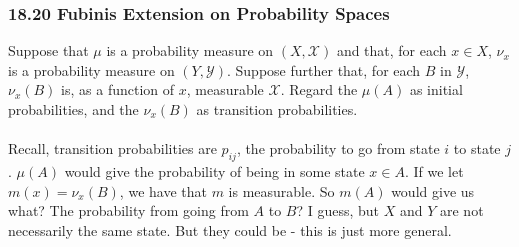 \documentclass[12pt,a4paper]{article}
\newcommand{\1}[1]{\mathbbm{1}\left\{ #1 \right\}}
\newcommand{\xcal}{\mathcal{X}}
\newcommand{\ycal}{\mathcal{Y}}
\begin{document}
\subsubsection{18.20 Fubinis Extension on Probability Spaces} Suppose that $\mu$ is a probability measure on $(X, \xcal)$ and that, for each $x \in X$, $\nu_x$ is a probability measure on $(Y, \ycal)$. Suppose further that, for each $B$ in $\ycal$, $\nu_x(B)$ is, as a function of $x$, measurable $\xcal$. Regard the $\mu(A)$ as initial probabilities, and the $\nu_x(B)$ as transition probabilities.
\\\\
Recall, transition probabilities are $p_{ij}$, the probability to go from state $i$ to state $j$. $\mu(A)$ would give the probability of being in some state $x \in A$. If we let $m(x) = \nu_x(B)$, we have that $m$ is measurable. So $m(A)$ would give us what? The probability from going from $A$ to $B$? I guess, but $X$ and $Y$ are not necessarily the same state. But they could be - this is just more general.
\end{document}
